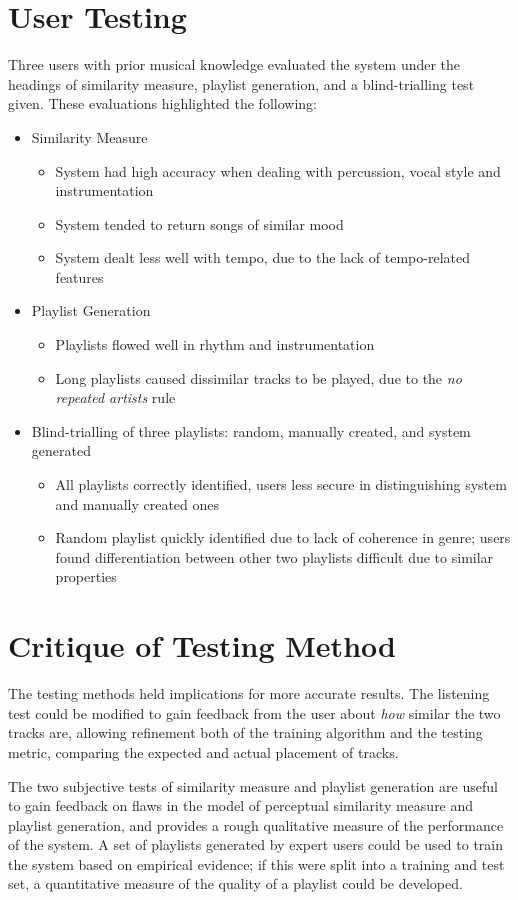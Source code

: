 \section{User Testing}
\label{text:testing:user}
Three users with prior musical knowledge evaluated the system under the headings of similarity measure, playlist generation, and a blind-trialling test given. These evaluations highlighted the following:
\begin{itemize}
	\item Similarity Measure
	\begin{itemize}
		\item System had high accuracy when dealing with percussion, vocal style and instrumentation
		\item System tended to return songs of similar mood
		\item System dealt less well with tempo, due to the lack of tempo-related features
	\end{itemize}
	\item Playlist Generation
	\begin{itemize}
		\item Playlists flowed well in rhythm and instrumentation
		\item Long playlists caused dissimilar tracks to be played, due to the \emph{no repeated artists} rule
	\end{itemize}
	\item Blind-trialling of three playlists: random, manually created, and system generated
	\begin{itemize}
		\item All playlists correctly identified, users less secure in distinguishing system and manually created ones
		\item Random playlist quickly identified due to lack of coherence in genre; users found differentiation between other two playlists difficult due to similar properties
	\end{itemize}
\end{itemize}
\section{Critique of Testing Method}
The testing methods held implications for more accurate results. The listening test could be modified to gain feedback from the user about \emph{how} similar the two tracks are, allowing refinement both of the training algorithm and the testing metric, comparing the expected and actual placement of tracks.

The two subjective tests of similarity measure and playlist generation are useful to gain feedback on flaws in the model of perceptual similarity measure and playlist generation, and provides a rough qualitative measure of the performance of the system. A set of playlists generated by expert users could be used to train the system based on empirical evidence; if this were split into a training and test set, a quantitative measure of the quality of a playlist could be developed.
